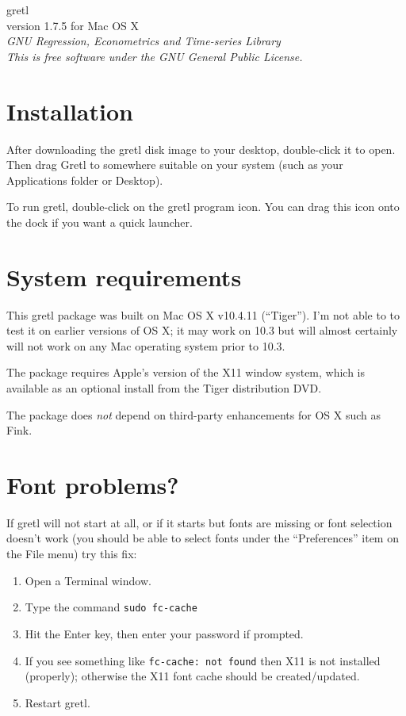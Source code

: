 \documentclass[11pt]{article}
\begin{document}
\begin{center}
{\color{gold} \titlefont gretl} \\[1ex]
version 1.7.5 for Mac OS X \\[2ex]

\textit{GNU Regression, Econometrics and Time-series Library\\
  This is free software under the GNU General Public License.}

\end{center}

\section{Installation}
\label{sec:install}

After downloading the gretl disk image to your desktop, double-click
it to open. Then drag \textsf{Gretl} to somewhere suitable on your
system (such as your \textsf{Applications} folder or Desktop).

To run gretl, double-click on the gretl program icon.  You can drag
this icon onto the dock if you want a quick launcher.

\section{System requirements}
\label{sec:os}

This gretl package was built on Mac OS X v10.4.11 (``Tiger'').  I'm not
able to to test it on earlier versions of OS X; it may work on 10.3
but will almost certainly will not work on any Mac operating system
prior to 10.3.

The package requires Apple's version of the X11 window system, which
is available as an optional install from the Tiger distribution DVD.

The package does \textit{not} depend on third-party enhancements for
OS X such as \textsf{Fink}.

\section{Font problems?}
\label{sec:fonts}

If gretl will not start at all, or if it starts but fonts are missing
or font selection doesn't work (you should be able to select fonts
under the ``Preferences'' item on the File menu) try this fix:

\begin{enumerate}
\item Open a Terminal window.
\item Type the command \texttt{sudo fc-cache}
\item Hit the Enter key, then enter your password if prompted.
\item If you see something like \texttt{fc-cache: not found} then
   X11 is not installed (properly); otherwise the X11 font cache
   should be created/updated.
\item Restart gretl.
\end{enumerate}
\end{document}
